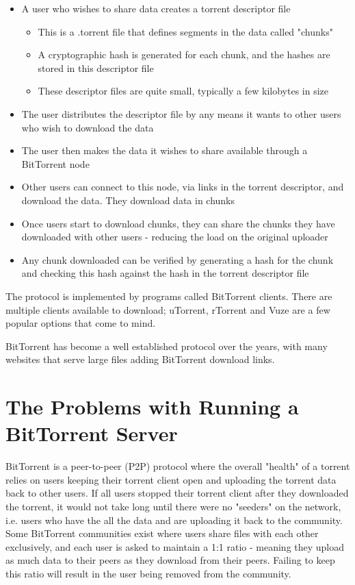 \begin{itemize}
	\item A user who wishes to share data creates a torrent descriptor file
	\begin{itemize}	
		\item This is a .torrent file that defines segments in the data called "chunks"
		\item A cryptographic hash is generated for each chunk, and the hashes are stored in this descriptor file
		\item These descriptor files are quite small, typically a few kilobytes in size
	\end{itemize}  
	\item The user distributes the descriptor file by any means it wants to other users who wish to download the data
	\item The user then makes the data it wishes to share available through a BitTorrent node
	\item Other users can connect to this node, via links in the torrent descriptor, and download the data. They download data in chunks 
	\item Once users start to download chunks, they can share the chunks they have downloaded with other users - reducing the load on the original uploader
	\item Any chunk downloaded can be verified by generating a hash for the chunk and checking this hash against the hash in the torrent descriptor file
\end{itemize}

The protocol is implemented by programs called BitTorrent clients. There are multiple clients available to download; uTorrent, rTorrent and Vuze are a few popular options that come to mind.

BitTorrent has become a well established protocol over the years, with many websites that serve large files adding BitTorrent download links.


\section{The Problems with Running a BitTorrent Server}
BitTorrent is a peer-to-peer (P2P) protocol where the overall "health" of a torrent relies on users keeping their torrent client open and uploading the torrent data back to other users. If all users stopped their torrent client after they downloaded the torrent, it would not take long until there were no "seeders" on the network, i.e. users who have the all the data and are uploading it back to the community. Some BitTorrent communities exist where users share files with each other exclusively, and each user is asked to maintain a 1:1 ratio - meaning they upload as much data to their peers as they download from their peers. Failing to keep this ratio will result in the user being removed from the community. 

